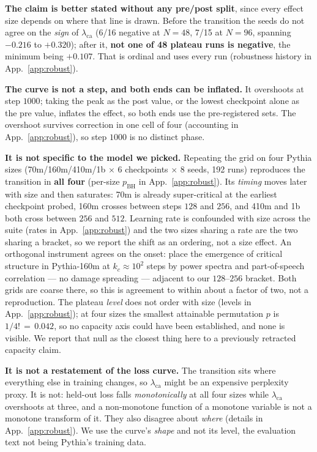 \documentclass{article}
\newcommand{\lca}{\ensuremath{\lambda_{\mathrm{ca}}}}
\begin{document}
\textbf{The claim is better stated without any pre/post split}, since every effect size depends
on where that line is drawn. Before the transition the seeds do not agree on the \emph{sign} of
$\lca$ (6/16 negative at $N{=}48$, 7/15 at $N{=}96$, spanning $-0.216$ to $+0.320$); after it,
\textbf{not one of 48 plateau runs is negative}, the minimum being $+0.107$. That is ordinal and uses
every run (robustness history in App.~\ref{app:robust}).

\textbf{The curve is not a step, and both ends can be inflated.} It overshoots at step $1000$;
taking the peak as the post value, or the lowest checkpoint alone as the pre value, inflates the
effect, so both ends use the pre-registered sets. The overshoot survives correction in one cell
of four (accounting in App.~\ref{app:robust}), so step $1000$ is no distinct phase.

\textbf{It is not specific to the model we picked.} Repeating the grid on four Pythia sizes
(70m/160m/410m/1b $\times$ 6 checkpoints $\times$ 8 seeds, 192 runs) reproduces the transition in
\textbf{all four} (per-size $p_{\mathrm{BH}}$ in App.~\ref{app:robust}). Its
\emph{timing} moves later with size and then saturates: 70m is already super-critical at the
earliest checkpoint probed, 160m crosses between steps $128$ and $256$, and 410m and 1b both
cross between $256$ and $512$. Learning rate is confounded with size across the suite (rates in App.~\ref{app:robust}) and the
two sizes sharing a rate are the two sharing a bracket, so we report the shift as an ordering,
not a size effect. An orthogonal instrument agrees on the onset:
\citet{ar_tempcrit} place the emergence of critical structure in Pythia-160m at $k_c{\approx}10^2$
steps by power spectra and part-of-speech correlation --- no damage spreading --- adjacent to our
$128$--$256$ bracket. Both grids are coarse there, so this is agreement to within about a factor
of two, not a reproduction. The plateau \emph{level} does not order with size
(levels in App.~\ref{app:robust}); at four sizes the smallest attainable permutation $p$ is
$1/4!\,{=}\,0.042$, so no capacity axis could have been established, and none is visible. We
report that null as the closest thing here to a previously retracted capacity claim.

\textbf{It is not a restatement of the loss curve.} The transition sits where everything else in
training changes, so \lca{} might be an expensive perplexity proxy. It is not: held-out loss falls
\emph{monotonically} at all four sizes while \lca{} overshoots at three, and a non-monotone
function of a monotone variable is not a monotone transform of it. They also disagree about
\emph{where} (details in App.~\ref{app:robust}). We use the curve's \emph{shape} and not
its level, the evaluation text not being Pythia's training data.
\end{document}
